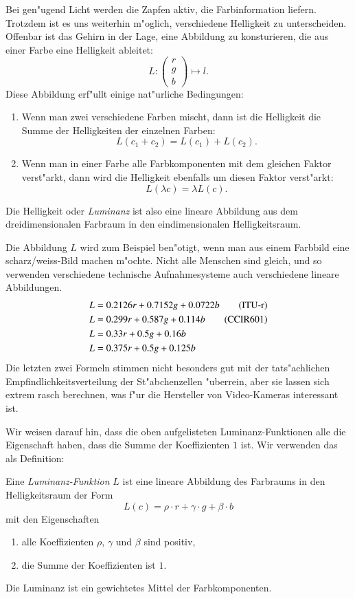 Bei gen"ugend Licht werden die Zapfen aktiv, die Farbinformation liefern.
Trotzdem ist es uns weiterhin m"oglich, verschiedene Helligkeit
zu unterscheiden.
Offenbar ist das Gehirn in der Lage, eine Abbildung zu konsturieren,
die aus einer Farbe eine Helligkeit ableitet:
\[
L\colon \begin{pmatrix}r\\g\\b\end{pmatrix}\mapsto l.
\]
Diese Abbildung erf"ullt einige nat"urliche Bedingungen:
\begin{enumerate}
\item Wenn man zwei verschiedene Farben mischt, dann ist die Helligkeit
die Summe der Helligkeiten der einzelnen Farben:
\[
L(c_1 + c_2)=L(c_1) + L(c_2).
\]
\item Wenn man in einer Farbe alle Farbkomponenten mit dem gleichen 
Faktor verst"arkt, dann wird die Helligkeit ebenfalls um diesen Faktor
verst"arkt:
\[
L(\lambda c)=\lambda L(c).
\]
\end{enumerate}
Die Helligkeit oder {\em Luminanz} ist also eine lineare Abbildung
aus dem dreidimensionalen Farbraum in den eindimensionalen Helligkeitsraum.

Die Abbildung $L$ wird zum Beispiel ben"otigt, wenn man aus einem Farbbild
eine scharz/weiss-Bild machen m"ochte.
Nicht alle Menschen sind gleich, und so verwenden 
verschiedene technische Aufnahmesysteme
auch verschiedene lineare Abbildungen.
\begin{align}
L&=0.2126 r+0.7152 g + 0.0722 b\tag{ITU-r}
\\
L&=0.299 r + 0.587 g + 0.114 b\tag{CCIR601}
\\
L&=0.33 r + 0.5 g + 0.16 b\notag
\\
L&=0.375 r + 0.5 g + 0.125 b\notag
\end{align}
Die letzten zwei Formeln stimmen nicht besonders gut mit der tats"achlichen
Empfindlichkeitsverteilung der St"abchenzellen "uberrein, aber sie lassen
sich extrem rasch berechnen, was f"ur die Hersteller von Video-Kameras 
interessant ist.

Wir weisen darauf hin, dass die oben aufgelisteten Luminanz-Funktionen
alle die Eigenschaft haben, dass die Summe der Koeffizienten $1$ ist.
Wir verwenden das als Definition:
\begin{definition} Eine {\em Luminanz-Funktion} $L$ ist eine lineare Abbildung
des Farbraums in den Helligkeitsraum der Form
\[
L(c)=\rho \cdot r + \gamma \cdot g + \beta \cdot b
\]
mit den Eigenschaften
\begin{enumerate}
\item alle Koeffizienten $\rho$, $\gamma$ und $\beta$ sind positiv,
\item die Summe der Koeffizienten ist $1$.
\end{enumerate}
\end{definition}
Die Luminanz ist ein gewichtetes Mittel der Farbkomponenten.

